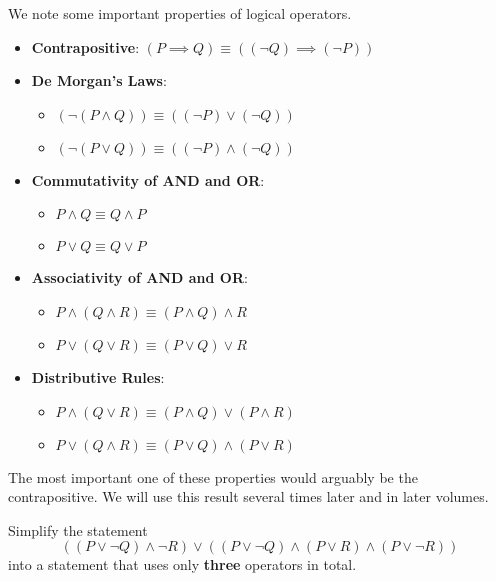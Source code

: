 We note some important properties of logical operators.
\begin{itemize}
    \item \textbf{Contrapositive}: $(P \implies Q) \equiv ((\lnot Q) \implies (\lnot P))$
    \item \textbf{De Morgan's Laws}: \begin{itemize}
        \item $(\lnot (P \land Q)) \equiv ((\lnot P) \lor (\lnot Q))$
        \item $(\lnot (P \lor Q)) \equiv ((\lnot P) \land (\lnot Q))$
    \end{itemize}

    \newpage

    \item \textbf{Commutativity of AND and OR}: \begin{itemize}
        \item $P \land Q \equiv Q \land P$
        \item $P \lor Q \equiv Q \lor P$
    \end{itemize}
    \item \textbf{Associativity of AND and OR}: \begin{itemize}
        \item $P \land (Q \land R) \equiv (P \land Q) \land R$
        \item $P \lor (Q \lor R) \equiv (P \lor Q) \lor R$
    \end{itemize}
    \item \textbf{Distributive Rules}: \begin{itemize}
        \item $P \land (Q \lor R) \equiv (P \land Q) \lor (P \land R)$
        \item $P \lor (Q \land R) \equiv (P \lor Q) \land (P \lor R)$
    \end{itemize}
\end{itemize}
\begin{remark}
    The most important one of these properties would arguably be the contrapositive. We will use this result several times later and in later volumes.
\end{remark}
\begin{exercise}
    Simplify the statement
    \[
        ((P \lor \lnot Q) \land \lnot R) \lor ((P \lor \lnot Q) \land (P \lor R) \land (P \lor \lnot R))
    \]
    into a statement that uses only \textbf{three} operators in total.
\end{exercise}

